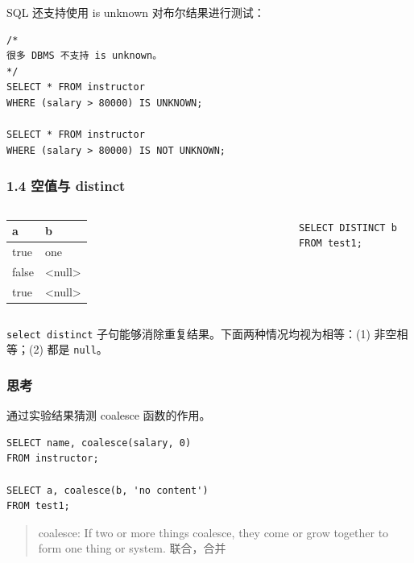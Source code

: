 \documentclass[aspectratio=169, 14pt]{beamer}
\begin{document}
\begin{frame}[fragile]
	SQL 还支持使用 \alert{is unknown} 对布尔结果进行测试：

	\begin{verbatim}
/*
很多 DBMS 不支持 is unknown。
*/
SELECT * FROM instructor
WHERE (salary > 80000) IS UNKNOWN;

SELECT * FROM instructor
WHERE (salary > 80000) IS NOT UNKNOWN;
\end{verbatim}

\end{frame}

\begin{frame}[fragile]
	\frametitle{1.4 空值与 distinct}
	\begin{columns}
		\begin{table}
			\begin{tabular}{ll}
				\toprule
				a     & b      \\
				\midrule
				true  & one    \\
				false & <null> \\
				true  & <null> \\
				\bottomrule
			\end{tabular}
		\end{table}
		\begin{verbatim}
SELECT DISTINCT b FROM test1;
        \end{verbatim}
	\end{columns}

	\pause
	\texttt{select distinct} 子句能够消除重复结果。下面两种情况均视为相等：(1) 非空相等；(2) 都是 \texttt{null}。

\end{frame}

\begin{frame}[fragile]
	\frametitle{思考}

	通过实验结果猜测 \alert{coalesce} 函数的作用。

	\begin{verbatim}
SELECT name, coalesce(salary, 0)
FROM instructor;

SELECT a, coalesce(b, 'no content')
FROM test1;
\end{verbatim}

	\begin{quote}
		coalesce: If two or more things coalesce, they come or grow together to form one thing or system. 联合，合并
	\end{quote}

\end{frame}
\end{document}
